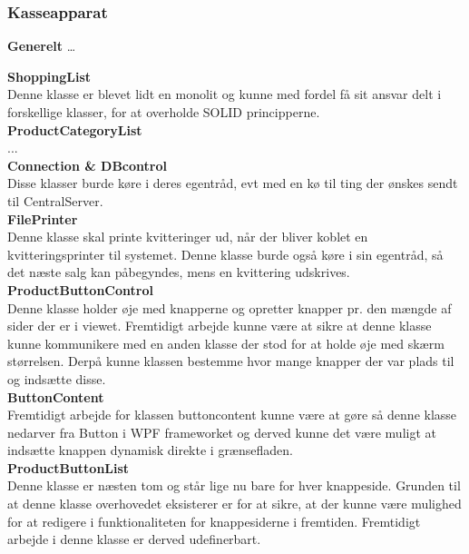 \subsubsection{Kasseapparat}

\textbf{Generelt} 
…

\textbf{ShoppingList} \\
Denne klasse er blevet lidt en monolit og kunne med fordel få sit ansvar delt i forskellige klasser, for at overholde SOLID principperne.\\ 


\textbf{ProductCategoryList} \\
... \\

\textbf{Connection \& DBcontrol} \\
Disse klasser burde køre i deres egentråd, evt med en kø til ting der ønskes sendt til CentralServer. \\

\textbf{FilePrinter} \\
Denne klasse skal printe kvitteringer ud, når der bliver koblet en kvitteringsprinter til systemet. Denne klasse burde også køre i sin egentråd, så det næste salg kan påbegyndes, mens en kvittering udskrives. \\

\textbf{ProductButtonControl} \\
Denne klasse holder øje med knapperne og opretter knapper pr. den mængde af sider der er i viewet. Fremtidigt arbejde kunne være at sikre at denne klasse kunne kommunikere med en anden klasse der stod for at holde øje med skærm størrelsen. Derpå kunne klassen bestemme hvor mange knapper der var plads til og indsætte disse. \\

\textbf{ButtonContent} \\
Fremtidigt arbejde for klassen buttoncontent kunne være at gøre så denne klasse nedarver fra Button i WPF frameworket og derved kunne det være muligt at indsætte knappen dynamisk direkte i grænsefladen. \\

\textbf{ProductButtonList}\\
Denne klasse er næsten tom og står lige nu bare for hver knappeside. Grunden til at denne klasse overhovedet eksisterer er for at sikre, at der kunne være mulighed for at redigere i funktionaliteten for knappesiderne i fremtiden. Fremtidigt arbejde i denne klasse er derved udefinerbart.\\

